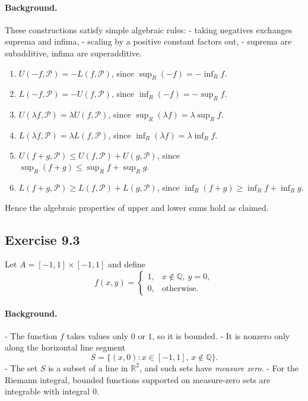 \documentclass[11pt,a4paper]{article}
\begin{document}
\paragraph{Background.}
These constructions satisfy simple algebraic rules:
- taking negatives exchanges suprema and infima,
- scaling by a positive constant factors out,
- suprema are subadditive, infima are superadditive.

\begin{enumerate}[label=\alph*)]
	\item $U(-f,\mathcal{P})=-L(f,\mathcal{P})$, since $\sup_R(-f)=-\inf_R f$.
	\item $L(-f,\mathcal{P})=-U(f,\mathcal{P})$, since $\inf_R(-f)=-\sup_R f$.
	\item $U(\lambda f,\mathcal{P})=\lambda U(f,\mathcal{P})$, since $\sup_R(\lambda f)=\lambda\sup_R f$.
	\item $L(\lambda f,\mathcal{P})=\lambda L(f,\mathcal{P})$, since $\inf_R(\lambda f)=\lambda\inf_R f$.
	\item $U(f+g,\mathcal{P})\leq U(f,\mathcal{P})+U(g,\mathcal{P})$, since $\sup_R(f+g)\leq \sup_R f+\sup_R g$.
	\item $L(f+g,\mathcal{P})\geq L(f,\mathcal{P})+L(g,\mathcal{P})$, since $\inf_R(f+g)\geq \inf_R f+\inf_R g$.
\end{enumerate}

Hence the algebraic properties of upper and lower sums hold as claimed.


\subsection*{Exercise 9.3}

Let $A=[-1,1]\times[-1,1]$ and define
\[
f(x,y)=
\begin{cases}
	1, & x\notin\mathbb{Q},\ y=0,\\[0.3em]
	0, & \text{otherwise}.
\end{cases}
\]

\paragraph{Background.}
- The function $f$ takes values only $0$ or $1$, so it is bounded.  
- It is nonzero only along the horizontal line segment
\[
S=\{(x,0): x\in[-1,1],\, x\notin\mathbb{Q}\}.
\]
- The set $S$ is a subset of a line in $\mathbb{R}^2$, and such sets have \emph{measure zero}.  
- For the Riemann integral, bounded functions supported on measure-zero sets are integrable with integral $0$.  
\end{document}
